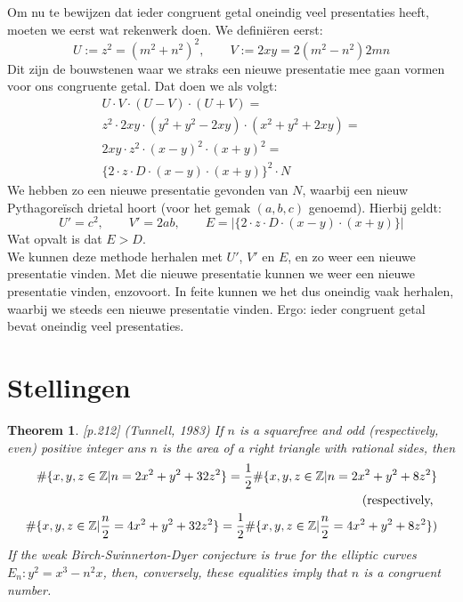 \documentclass[12pt,reqno]{article}
\newcommand*{\ZZ}{\ensuremath{\mathbb{Z}}}
\begin{document}
	Om nu te bewijzen dat ieder congruent getal oneindig veel presentaties heeft, moeten we eerst wat rekenwerk doen. We defini\"eren eerst:
	\begin{equation}
		U:= z^2=(m^2+n^2)^2, \qquad V:= 2xy=2(m^2-n^2)2mn
	\end{equation}
	Dit zijn de bouwstenen waar we straks een nieuwe presentatie mee gaan vormen voor ons congruente getal. Dat doen we als volgt:
	\begin{align}
			U\cdot V \cdot (U-V) \cdot (U+V)=\\
			z^2\cdot 2xy\cdot (y^2+y^2-2xy)\cdot (x^2+y^2+2xy)=\\
			2xy\cdot z^2\cdot (x-y)^2\cdot (x+y)^2=\\
			\{2\cdot z\cdot D\cdot (x-y)\cdot (x+y)\}^2\cdot N
	\end{align}
	We hebben zo een nieuwe presentatie gevonden van $N$, waarbij een nieuw Pythagore\"isch drietal hoort (voor het gemak $(a,b,c)$ genoemd). Hierbij geldt:
	\begin{equation}
		U'=c^2, \qquad V'=2ab, \qquad E=|\{2\cdot z\cdot D\cdot (x-y)\cdot (x+y)\}|
	\end{equation}
	Wat opvalt is dat $E>D$.\\
	
	We kunnen deze methode herhalen met $U'$, $V'$ en $E$, en zo weer een nieuwe presentatie vinden. Met die nieuwe presentatie kunnen we weer een nieuwe presentatie vinden, enzovoort. In feite kunnen we het dus oneindig vaak herhalen, waarbij we steeds een nieuwe presentatie vinden. Ergo: ieder congruent getal bevat oneindig veel presentaties.
	
	
	\section{Stellingen}
	\newtheorem{Tunnell}{Theorem}
	\begin{Tunnell}
		\cite{Koblitz}[p.212] (Tunnell, 1983) If $n$ is a squarefree and odd (respectively, even) positive integer ans $n$ is the area of a right triangle with rational sides, then
		\begin{align}
		\#\{x,y,z\in\ZZ|n=2x^2+y^2+32z^2\} = \frac{1}{2}\#\{x,y,z\in\ZZ|n=2x^2+y^2+8z^2\}\\
		\notag \text{(respectively, } \\
		\#\{x,y,z\in\ZZ|\frac{n}{2}=4x^2+y^2+32z^2\} = \frac{1}{2}\#\{x,y,z\in\ZZ|\frac{n}{2}=4x^2+y^2+8z^2\})
		\end{align}
		If the weak Birch-Swinnerton-Dyer conjecture is true for the elliptic curves $E_n:y^2=x^3-n^2x$, then, conversely, these equalities imply that $n$ is a congruent number.
	\end{Tunnell}
	
\end{document}

